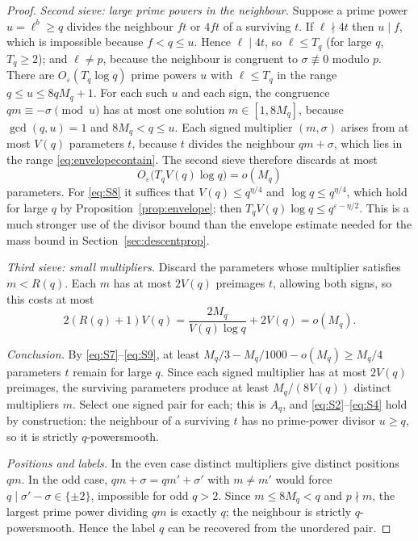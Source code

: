 \documentclass[11pt,letterpaper]{article}
\numberwithin{equation}{section}
\theoremstyle{plain}
\theoremstyle{remark}
\begin{document}
\begin{proof}
\emph{Second sieve: large prime powers in the neighbour.} Suppose a prime power $u=\ell^b\ge q$ divides the neighbour $ft$ or $4ft$ of a surviving $t$. If $\ell\nmid4t$ then $u\mid f$, which is impossible because $f<q\le u$. Hence $\ell\mid4t$, so $\ell\le T_q$ (for large $q$, $T_q\ge2$); and $\ell\ne p$, because the neighbour is congruent to $\sigma\not\equiv0$ modulo $p$. There are $O_\varepsilon(T_q\log q)$ prime powers $u$ with $\ell\le T_q$ in the range $q\le u\le8qM_q+1$. For each such $u$ and each sign, the congruence $qm\equiv-\sigma\pmod u$ has at most one solution $m\in[1,8M_q]$, because $\gcd(q,u)=1$ and $8M_q<q\le u$. Each signed multiplier $(m,\sigma)$ arises from at most $V(q)$ parameters $t$, because $t$ divides the neighbour $qm+\sigma$, which lies in the range \eqref{eq:envelopecontain}. The second sieve therefore discards at most
\begin{equation}\label{eq:S8}
O_\varepsilon\bigl(T_qV(q)\log q\bigr)=o(M_q)
\end{equation}
parameters. For \eqref{eq:S8} it suffices that $V(q)\le q^{\eta/4}$ and $\log q\le q^{\eta/4}$, which hold for large $q$ by Proposition~\ref{prop:envelope}; then $T_qV(q)\log q\le q^{\varepsilon-\eta/2}$. This is a much stronger use of the divisor bound than the envelope estimate needed for the mass bound in Section~\ref{sec:descentprop}.

\emph{Third sieve: small multipliers.} Discard the parameters whose multiplier satisfies $m<R(q)$. Each $m$ has at most $2V(q)$ preimages $t$, allowing both signs, so this costs at most
\begin{equation}\label{eq:S9}
2(R(q)+1)V(q)=\frac{2M_q}{V(q)\log q}+2V(q)=o(M_q).
\end{equation}

\emph{Conclusion.} By \eqref{eq:S7}--\eqref{eq:S9}, at least $M_q/3-M_q/1000-o(M_q)\ge M_q/4$ parameters $t$ remain for large $q$. Since each signed multiplier has at most $2V(q)$ preimages, the surviving parameters produce at least $M_q/(8V(q))$ distinct multipliers $m$. Select one signed pair for each; this is $A_q$, and \eqref{eq:S2}--\eqref{eq:S4} hold by construction: the neighbour of a surviving $t$ has no prime-power divisor $u\ge q$, so it is strictly $q$-powersmooth.

\emph{Positions and labels.} In the even case distinct multipliers give distinct positions $qm$. In the odd case, $qm+\sigma=qm'+\sigma'$ with $m\ne m'$ would force $q\mid\sigma'-\sigma\in\{\pm2\}$, impossible for odd $q>2$. Since $m\le8M_q<q$ and $p\nmid m$, the largest prime power dividing $qm$ is exactly $q$; the neighbour is strictly $q$-powersmooth. Hence the label $q$ can be recovered from the unordered pair.
\end{proof}
\end{document}
